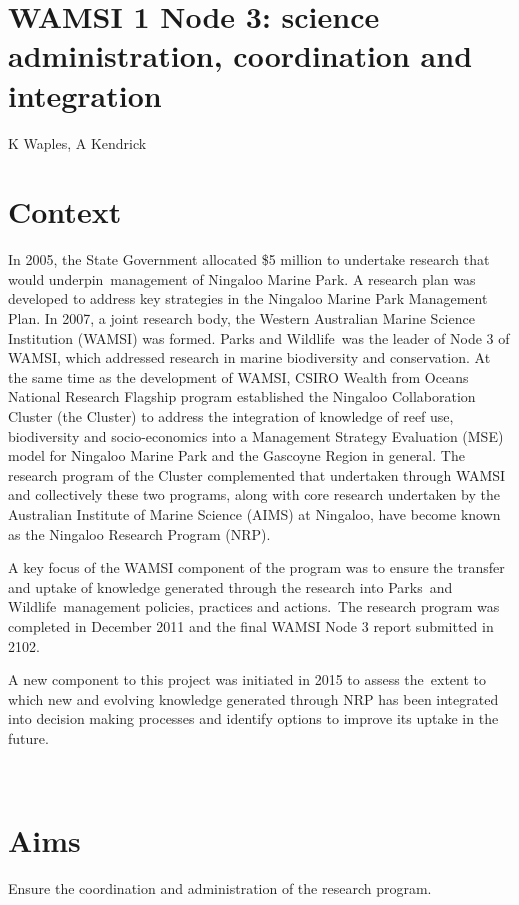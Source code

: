 \documentclass[version=last,
    paper=a4, %
    10pt, %
    usenames,
    dvipsnames,
    oneside, %
    headings=openany, %
    DIV=15 %
]{scrbook}
\begin{document}
\section*{WAMSI 1 Node 3: science administration, coordination and integration
}

K Waples, A Kendrick


\section*{Context}
In 2005, the State Government allocated \$5 million to undertake
research that would underpin~management of Ningaloo Marine Park. A
research plan was developed to address key strategies in the Ningaloo
Marine Park Management Plan. In 2007, a joint research body, the Western
Australian Marine Science Institution (WAMSI) was formed. Parks and
Wildlife~was the leader of Node 3 of WAMSI, which addressed research in
marine biodiversity and conservation. At the same time as the
development of WAMSI, CSIRO Wealth from Oceans National Research
Flagship program established the Ningaloo Collaboration Cluster (the
Cluster) to address the integration of knowledge of reef use,
biodiversity and socio-economics into a Management Strategy Evaluation
(MSE) model for Ningaloo Marine Park and the Gascoyne Region in general.
The research program of the Cluster complemented that undertaken through
WAMSI and collectively these two programs, along with core research
undertaken by the Australian Institute of Marine Science (AIMS) at
Ningaloo, have become known as the Ningaloo Research Program (NRP).

A key focus of the WAMSI component of the program was to ensure the
transfer and uptake of knowledge generated through the research into
Parks~and Wildlife~management policies, practices and actions.~The
research program was completed in December 2011 and the final WAMSI Node
3 report submitted in 2102.

A new component to this project was initiated in 2015 to assess
the~extent to which new and evolving knowledge generated through NRP has
been integrated into decision making processes and identify options to
improve its uptake in the future.~

~



\section*{Aims}
Ensure the coordination and administration of the research program.
\end{document}
